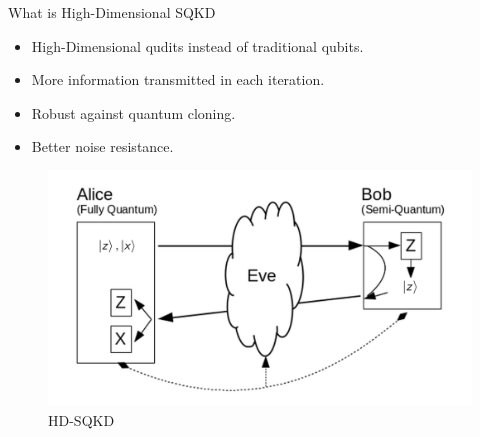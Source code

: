 \documentclass[final]{beamer}
\newlength{\onecolwid}
\newlength{\twocolwid}
\begin{document}
\begin{frame}[t]
\begin{columns}[t]
\begin{column}{\twocolwid} %

\begin{columns}[t,totalwidth=\twocolwid] %

\begin{column}{\onecolwid}\vspace{-.6in} %


\begin{block}{What is High-Dimensional SQKD}

\begin{itemize}
\item High-Dimensional qudits instead of traditional qubits. 
\item More information transmitted in each iteration. 
\item Robust against quantum cloning.
\item Better noise resistance. 
\end{itemize}

\begin{figure}
	\includegraphics[width=\linewidth]{sqkd_hidim}
	\caption{HD-SQKD}
	\label{fig:sqkd_hidim}
\end{figure}


\end{block}


\end{column} %


\end{columns}
\end{column}
\end{columns}
\end{frame}
\end{document}
